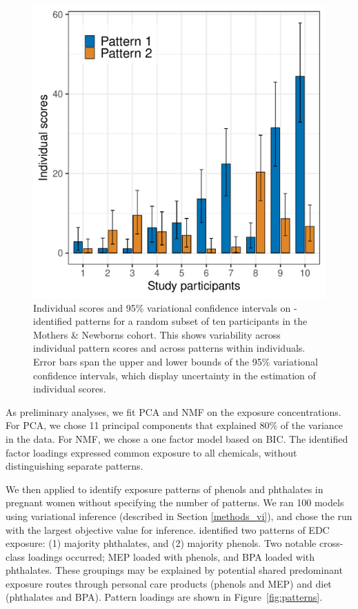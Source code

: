 \begin{landscape}
\begin{figure}
\centering
\includegraphics[scale = 0.75]{./figures/scores_w_vci.pdf}
\caption[Individual scores and variational confidence intervals]{Individual scores and 95\% variational confidence intervals on \bnmfc-identified patterns for a random subset of ten participants in the Mothers \& Newborns cohort. This shows variability across individual pattern scores and across patterns within individuals. Error bars span the upper and lower bounds of the 95\% variational confidence intervals, which display uncertainty in the estimation of individual scores.}
\label{fig:scores}
\end{figure}
\end{landscape}

As preliminary analyses, we fit PCA and NMF on the exposure concentrations. For PCA, we chose 11 principal components that explained 80\% of the variance in the data. For NMF, we chose a one factor model based on BIC. The identified factor loadings expressed common exposure to all chemicals, without distinguishing separate patterns.

We then applied \bnmf to identify exposure patterns of phenols and phthalates in pregnant women without specifying the number of patterns. We ran 100 models using variational inference (described in Section \ref{methods_vi}), and chose the run with the largest objective value for inference. \bnmf identified two patterns of EDC exposure: (1) majority phthalates, and (2) majority phenols. Two notable cross-class loadings occurred; MEP loaded with phenols, and BPA loaded with phthalates. These groupings may be explained by potential shared predominant exposure routes through personal care products (phenols and MEP) and diet (phthalates and BPA). Pattern loadings are shown in Figure~\ref{fig:patterns}. 

